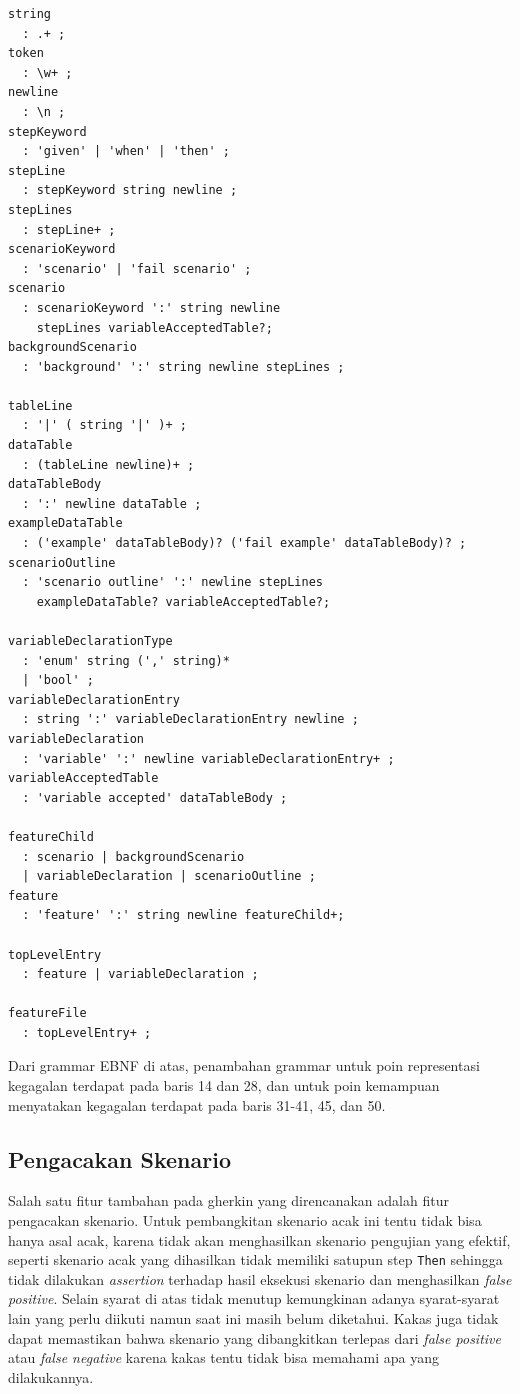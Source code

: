 \begin{lstlisting}[language=ebnf]
string
  : .+ ;
token
  : \w+ ;
newline
  : \n ;
stepKeyword
  : 'given' | 'when' | 'then' ;
stepLine
  : stepKeyword string newline ;
stepLines
  : stepLine+ ;
scenarioKeyword
  : 'scenario' | 'fail scenario' ;
scenario
  : scenarioKeyword ':' string newline
    stepLines variableAcceptedTable?;
backgroundScenario
  : 'background' ':' string newline stepLines ;

tableLine
  : '|' ( string '|' )+ ;
dataTable
  : (tableLine newline)+ ;
dataTableBody
  : ':' newline dataTable ;
exampleDataTable
  : ('example' dataTableBody)? ('fail example' dataTableBody)? ;
scenarioOutline
  : 'scenario outline' ':' newline stepLines
    exampleDataTable? variableAcceptedTable?;

variableDeclarationType
  : 'enum' string (',' string)*
  | 'bool' ;
variableDeclarationEntry
  : string ':' variableDeclarationEntry newline ;
variableDeclaration
  : 'variable' ':' newline variableDeclarationEntry+ ;
variableAcceptedTable
  : 'variable accepted' dataTableBody ;

featureChild
  : scenario | backgroundScenario
  | variableDeclaration | scenarioOutline ;
feature
  : 'feature' ':' string newline featureChild+;

topLevelEntry
  : feature | variableDeclaration ;

featureFile
  : topLevelEntry+ ;
\end{lstlisting}

Dari grammar EBNF di atas, penambahan grammar untuk poin representasi kegagalan terdapat pada baris 14 dan 28,
dan untuk poin kemampuan menyatakan kegagalan terdapat pada baris 31-41, 45, dan 50.

\subsection{Pengacakan Skenario}

Salah satu fitur tambahan pada gherkin yang direncanakan adalah fitur pengacakan skenario.
Untuk pembangkitan skenario acak ini tentu tidak bisa hanya asal acak, karena tidak akan menghasilkan
skenario pengujian yang efektif, seperti skenario acak yang dihasilkan tidak memiliki satupun step \texttt{Then}
sehingga tidak dilakukan \textit{assertion} terhadap hasil eksekusi skenario dan menghasilkan \textit{false positive}.
Selain syarat di atas tidak menutup kemungkinan adanya syarat-syarat lain yang perlu diikuti namun saat ini masih belum
diketahui.
Kakas juga tidak dapat memastikan bahwa skenario yang dibangkitkan terlepas dari \textit{false positive} atau
\textit{false negative} karena kakas tentu tidak bisa memahami apa yang dilakukannya.

